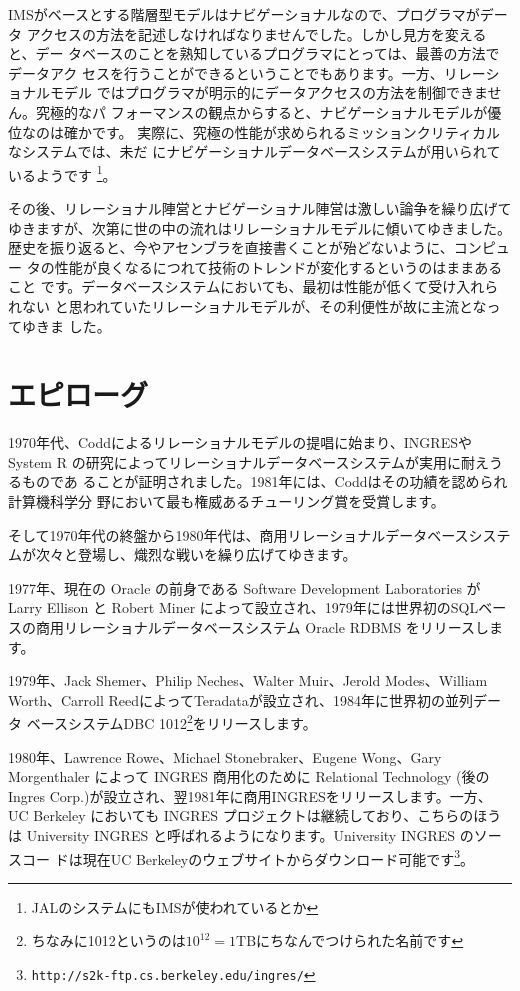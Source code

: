 IMSがベースとする階層型モデルはナビゲーショナルなので、プログラマがデータ
アクセスの方法を記述しなければなりませんでした。しかし見方を変えると、デー
タベースのことを熟知しているプログラマにとっては、最善の方法でデータアク
セスを行うことができるということでもあります。一方、リレーショナルモデル
ではプログラマが明示的にデータアクセスの方法を制御できません。究極的なパ
フォーマンスの観点からすると、ナビゲーショナルモデルが優位なのは確かです。
実際に、究極の性能が求められるミッションクリティカルなシステムでは、未だ
にナビゲーショナルデータベースシステムが用いられているようです
\footnote{JALのシステムにもIMSが使われているとか}。


その後、リレーショナル陣営とナビゲーショナル陣営は激しい論争を繰り広げて
ゆきますが、次第に世の中の流れはリレーショナルモデルに傾いてゆきました。
歴史を振り返ると、今やアセンブラを直接書くことが殆どないように、コンピュー
タの性能が良くなるにつれて技術のトレンドが変化するというのはままあること
です。データベースシステムにおいても、最初は性能が低くて受け入れられない
と思われていたリレーショナルモデルが、その利便性が故に主流となってゆきま
した。


\section{エピローグ}


1970年代、Coddによるリレーショナルモデルの提唱に始まり、INGRESやSystem R
の研究によってリレーショナルデータベースシステムが実用に耐えうるものであ
ることが証明されました。1981年には、Coddはその功績を認められ計算機科学分
野において最も権威あるチューリング賞を受賞します。


そして1970年代の終盤から1980年代は、商用リレーショナルデータベースシステ
ムが次々と登場し、熾烈な戦いを繰り広げてゆきます。


1977年、現在の Oracle の前身である Software Development Laboratories が
Larry Ellison と Robert Miner によって設立され、1979年には世界初のSQLベー
スの商用リレーショナルデータベースシステム Oracle RDBMS をリリースします。


1979年、Jack Shemer、Philip Neches、Walter Muir、Jerold Modes、William
Worth、Carroll ReedによってTeradataが設立され、1984年に世界初の並列データ
ベースシステムDBC 1012\footnote{ちなみに1012というのは$10^{12} = 1 \mathrm{TB}$にちなんでつけられた名前です}をリリースします。


1980年、Lawrence Rowe、Michael Stonebraker、Eugene Wong、Gary
Morgenthaler によって INGRES 商用化のために Relational Technology (後の
Ingres Corp.)が設立され、翌1981年に商用INGRESをリリースします。一方、UC
Berkeley においても INGRES プロジェクトは継続しており、こちらのほうは
University INGRES と呼ばれるようになります。University INGRES のソースコー
ドは現在UC Berkeleyのウェブサイトからダウンロード可能です\footnote{\verb|http://s2k-ftp.cs.berkeley.edu/ingres/|}。


